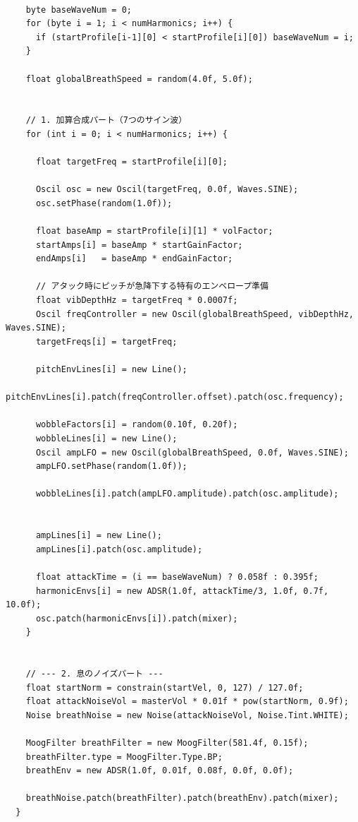 \begin{lstlisting}[caption={Trumpet.pde}, label={lst:proc_trumpet}]
    
    byte baseWaveNum = 0;
    for (byte i = 1; i < numHarmonics; i++) {
      if (startProfile[i-1][0] < startProfile[i][0]) baseWaveNum = i;
    }
    
    float globalBreathSpeed = random(4.0f, 5.0f);
    
    
    // 1. 加算合成パート（7つのサイン波）
    for (int i = 0; i < numHarmonics; i++) {
      
      float targetFreq = startProfile[i][0];
      
      Oscil osc = new Oscil(targetFreq, 0.0f, Waves.SINE);
      osc.setPhase(random(1.0f));
      
      float baseAmp = startProfile[i][1] * volFactor;
      startAmps[i] = baseAmp * startGainFactor;
      endAmps[i]   = baseAmp * endGainFactor;
      
      // アタック時にピッチが急降下する特有のエンベロープ準備
      float vibDepthHz = targetFreq * 0.0007f; 
      Oscil freqController = new Oscil(globalBreathSpeed, vibDepthHz, Waves.SINE);
      targetFreqs[i] = targetFreq;
      
      pitchEnvLines[i] = new Line();
      pitchEnvLines[i].patch(freqController.offset).patch(osc.frequency);
      
      wobbleFactors[i] = random(0.10f, 0.20f); 
      wobbleLines[i] = new Line();
      Oscil ampLFO = new Oscil(globalBreathSpeed, 0.0f, Waves.SINE);
      ampLFO.setPhase(random(1.0f)); 
      
      wobbleLines[i].patch(ampLFO.amplitude).patch(osc.amplitude);
      
      
      ampLines[i] = new Line();
      ampLines[i].patch(osc.amplitude); 
      
      float attackTime = (i == baseWaveNum) ? 0.058f : 0.395f;
      harmonicEnvs[i] = new ADSR(1.0f, attackTime/3, 1.0f, 0.7f, 10.0f);
      osc.patch(harmonicEnvs[i]).patch(mixer);
    }
    
    
    // --- 2. 息のノイズパート ---
    float startNorm = constrain(startVel, 0, 127) / 127.0f;
    float attackNoiseVol = masterVol * 0.01f * pow(startNorm, 0.9f); 
    Noise breathNoise = new Noise(attackNoiseVol, Noise.Tint.WHITE);
    
    MoogFilter breathFilter = new MoogFilter(581.4f, 0.15f);
    breathFilter.type = MoogFilter.Type.BP;
    breathEnv = new ADSR(1.0f, 0.01f, 0.08f, 0.0f, 0.0f);
    
    breathNoise.patch(breathFilter).patch(breathEnv).patch(mixer);
  }
  

\end{lstlisting}
